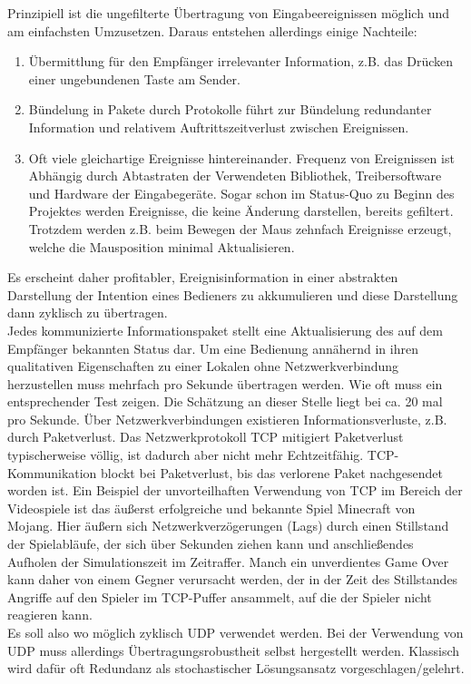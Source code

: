 Prinzipiell ist die ungefilterte Übertragung von Eingabeereignissen möglich und am einfachsten Umzusetzen. Daraus entstehen allerdings einige Nachteile:
\begin{enumerate}
\item Übermittlung für den Empfänger irrelevanter Information, z.B. das Drücken einer ungebundenen Taste am Sender.
\item Bündelung in Pakete durch Protokolle führt zur Bündelung redundanter Information und relativem Auftrittszeitverlust zwischen Ereignissen.
\item Oft viele gleichartige Ereignisse hintereinander. Frequenz von Ereignissen ist Abhängig durch Abtastraten der Verwendeten Bibliothek, Treibersoftware und Hardware der Eingabegeräte. Sogar schon im Status-Quo zu Beginn des Projektes werden Ereignisse, die keine Änderung darstellen, bereits gefiltert. Trotzdem werden z.B. beim Bewegen der Maus zehnfach Ereignisse erzeugt, welche die Mausposition minimal Aktualisieren.
\end{enumerate}
Es erscheint daher profitabler, Ereignisinformation in einer abstrakten Darstellung der Intention eines Bedieners zu akkumulieren und diese Darstellung dann zyklisch zu übertragen.\\
Jedes kommunizierte Informationspaket stellt eine Aktualisierung des auf dem Empfänger bekannten Status dar.
Um eine Bedienung annähernd in ihren qualitativen Eigenschaften zu einer Lokalen ohne Netzwerkverbindung herzustellen muss mehrfach pro Sekunde übertragen werden. Wie oft muss ein entsprechender Test zeigen. Die Schätzung an dieser Stelle liegt bei ca. 20 mal pro Sekunde.
Über Netzwerkverbindungen existieren Informationsverluste, z.B. durch Paketverlust. Das Netzwerkprotokoll TCP mitigiert Paketverlust typischerweise völlig, ist dadurch aber nicht mehr Echtzeitfähig. TCP-Kommunikation blockt bei Paketverlust, bis das verlorene Paket nachgesendet worden ist. 
Ein Beispiel der unvorteilhaften Verwendung von TCP im Bereich der Videospiele ist das äußerst erfolgreiche und bekannte Spiel Minecraft von Mojang. Hier äußern sich Netzwerkverzögerungen (Lags) durch einen Stillstand der Spielabläufe, der sich über Sekunden ziehen kann und anschließendes Aufholen der Simulationszeit im Zeitraffer. Manch ein unverdientes Game Over kann daher von einem Gegner verursacht werden, der in der Zeit des Stillstandes Angriffe auf den Spieler im TCP-Puffer ansammelt, auf die der Spieler nicht reagieren kann.\\
Es soll also wo möglich zyklisch UDP verwendet werden. Bei der Verwendung von UDP muss allerdings Übertragungsrobustheit selbst hergestellt werden. Klassisch wird dafür oft Redundanz als stochastischer Lösungsansatz vorgeschlagen/gelehrt.
